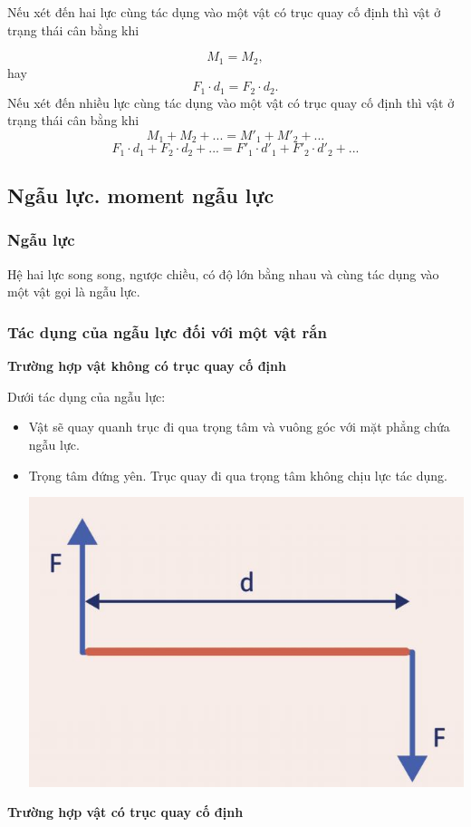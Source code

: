 Nếu xét đến hai lực cùng tác dụng vào một vật có trục quay cố định thì vật ở trạng thái cân bằng khi

\begin{equation*}
	M_1 = M_2,
\end{equation*}
%
hay
%
\begin{equation*}
	F_1\cdot d_1 = F_2\cdot d_2. \label{eq2}
\end{equation*}
%
Nếu xét đến nhiều lực cùng tác dụng vào một vật có trục quay cố định thì vật ở trạng thái cân bằng khi
%
\begin{equation*}
	M_1+M_2+... = M'_1+M'_2+... 
\end{equation*}
%
\begin{equation*}
	F_1\cdot d_1+F_2\cdot d_2 + ... = F'_1\cdot d'_1 + F'_2\cdot d'_2+...
\end{equation*}
%
\subsection{Ngẫu lực. moment ngẫu lực}
\subsubsection{Ngẫu lực}
Hệ hai lực song song, ngược chiều, có độ lớn bằng nhau và cùng tác dụng vào một vật gọi là ngẫu lực.
\subsubsection{Tác dụng của ngẫu lực đối với một vật rắn}
\textbf{Trường hợp vật không có trục quay cố định}

Dưới tác dụng của ngẫu lực:
\begin{itemize}
	\item  Vật sẽ quay quanh trục đi qua trọng tâm và vuông góc với mặt phẳng chứa ngẫu lực.
	\item Trọng tâm đứng yên. Trục quay đi qua trọng tâm không chịu lực tác dụng.
	\begin{center}
		\includegraphics[scale=0.4]{../figs/VN10-PH-25-L-020-1-V2-01.JPG}
	\end{center}	
\end{itemize}
\textbf{Trường hợp vật có trục quay cố định}

